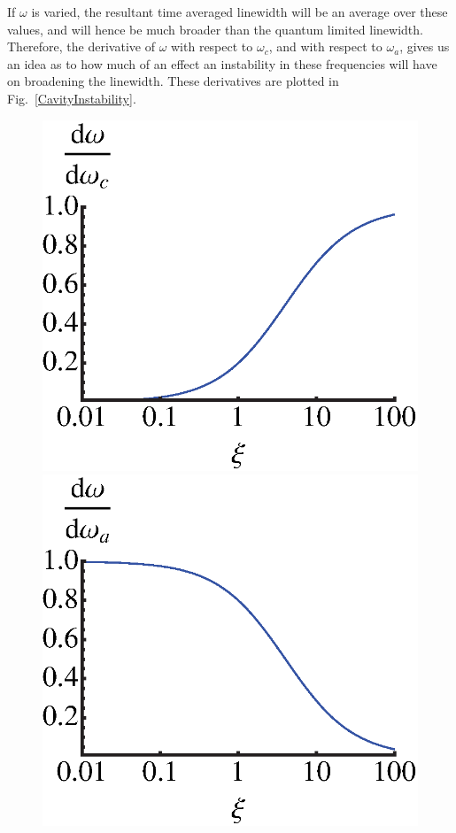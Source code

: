 \documentclass[aps,prl,twocolumn,
superscriptaddress,groupedaddress]{revtex4}
\begin{document}
If $\omega$ is varied, the resultant time averaged linewidth will be an
average over these values, and will hence be much broader than the
quantum limited linewidth. Therefore, the derivative of  $\omega$ with
respect to $\omega_c$, and with respect to $\omega_a$, gives us an idea
as to how much of an effect an instability in these frequencies will
have on broadening the linewidth. These derivatives are plotted in
Fig.~\ref{CavityInstability}.

\begin{figure}
\begin{center}
	\includegraphics[scale=0.44] {CavityInstability.eps}
	\includegraphics[scale=0.44] {AtomInstability.eps}\\

\end{center}
\end{figure}
\end{document}
